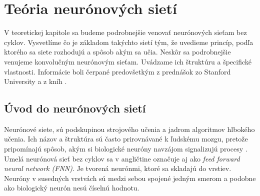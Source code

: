 \chapter{Teória neurónových sietí}\label{chap:theory}

V teoretickej kapitole sa budeme podrobnejšie venovať neurónových sieťam bez cyklov. Vysvetlíme čo je základom takýchto sietí tým, že uvedieme princíp, podľa ktorého sa siete rozhodujú a spôsob akým sa učia. Neskôr sa podrobnejšie venujeme konvolučným neurónovým sieťam. Uvádzame ich štruktúru a špecifické vlastnosti. Informácie boli čerpané predovšetkým z prednášok zo Stanford University \cite{SF} a z kníh \cite{RosinPaulL2019RIAa, Goodfellow-et-al-2016}. 


\section{Úvod do neurónových sietí}

Neurónové siete, sú podskupinou strojového učenia a jadrom algoritmov hlbokého učenia. Ich názov a štruktúra sú často prirovnávané k ľudskému mozgu, pretože pripomínajú spôsob, akým si biologické neuróny navzájom signalizujú procesy \cite{Shanmuganathan2016}. Umelá neurónová sieť bez cyklov sa v angličtine označuje aj ako \textit{feed forward neural network (FNN)}. Je tvorená neurónmi, ktoré sa skladajú do vrstiev. Neuróny v susedných vrstvách sú medzi sebou spojené jedným smerom a podobne ako biologický neurón nesú číselnú hodnotu. 

